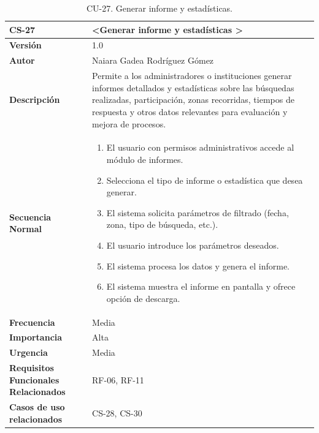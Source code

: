 \begin{table}[htbp] %
\centering
\begin{tabular}{ |m{3cm}|m{11cm}|  } 
\hline
\cellcolor[HTML]{B9E3F0}\centering\textbf{CS-27} & \cellcolor[HTML]{B9E3F0}\textbf{\textless Generar informe y estadísticas \textgreater}\\

\hline
\cellcolor[HTML]{EFEFEF}\textbf{Versión}             & 1.0  \\
\hline
\cellcolor[HTML]{EFEFEF}\textbf{Autor}                & Naiara Gadea Rodríguez Gómez\\
\hline
\cellcolor[HTML]{EFEFEF}\textbf{Descripción}                & {Permite a los administradores o instituciones generar informes detallados y estadísticas sobre las búsquedas realizadas, participación, zonas recorridas, tiempos de respuesta y otros datos relevantes para evaluación y mejora de procesos.}\\
\hline
\cellcolor[HTML]{EFEFEF}\textbf{Secuencia \newline Normal}                &                 
        \begin{enumerate}
			\item El usuario con permisos administrativos accede al módulo de informes.
			\item Selecciona el tipo de informe o estadística que desea generar.
			\item El sistema solicita parámetros de filtrado (fecha, zona, tipo de búsqueda, etc.).
			\item El usuario introduce los parámetros deseados.
			\item El sistema procesa los datos y genera el informe.
			\item El sistema muestra el informe en pantalla y ofrece opción de descarga.
		\end{enumerate}\\
\hline
\cellcolor[HTML]{EFEFEF}\textbf{Frecuencia}                & Media\\
\hline
\cellcolor[HTML]{EFEFEF}\textbf{Importancia}                & Alta\\
\hline
\cellcolor[HTML]{EFEFEF}\textbf{Urgencia}                & Media\\
\hline
\cellcolor[HTML]{EFEFEF}\textbf{Requisitos Funcionales Relacionados}                & {RF-06, RF-11}\\
\hline
\cellcolor[HTML]{EFEFEF}\textbf{Casos de uso relacionados}                & {CS-28, CS-30}\\
\hline
\end{tabular}
\caption{CU-27. Generar informe y estadísticas.}
\end{table}

